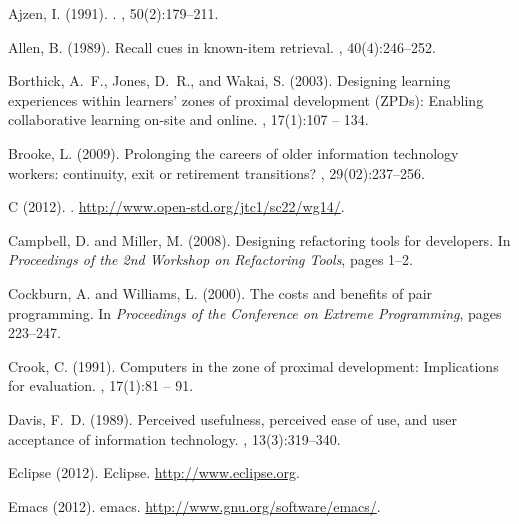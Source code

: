 \documentclass[smallextended]{svjour3}
\begin{document}

\begin{thebibliography}{}

Ajzen, I. (1991).
.
,
  50(2):179--211.

Allen, B. (1989).
\newblock Recall cues in known-item retrieval.
,
  40(4):246--252.

Borthick, A.~F., Jones, D.~R., and Wakai, S. (2003).
\newblock Designing learning experiences within learners' zones of proximal
  development ({ZPDs}): Enabling collaborative learning on-site and online.
, 17(1):107 -- 134.

Brooke, L. (2009).
\newblock Prolonging the careers of older information technology workers:
  continuity, exit or retirement transitions?
, 29(02):237--256.

C (2012).
.
\newblock \url{http://www.open-std.org/jtc1/sc22/wg14/}.

Campbell, D. and Miller, M. (2008).
\newblock Designing refactoring tools for developers.
\newblock In {\em Proceedings of the 2nd Workshop on Refactoring Tools}, pages
  1--2.

Cockburn, A. and Williams, L. (2000).
\newblock The costs and benefits of pair programming.
\newblock In {\em Proceedings of the Conference on Extreme Programming}, pages
  223--247.

Crook, C. (1991).
\newblock Computers in the zone of proximal development: Implications for
  evaluation.
, 17(1):81 -- 91.

Davis, F.~D. (1989).
\newblock Perceived usefulness, perceived ease of use, and user acceptance of
  information technology.
, 13(3):319--340.

Eclipse (2012).
\newblock Eclipse.
\newblock \url{http://www.eclipse.org}.

Emacs (2012).
\newblock emacs.
\newblock \url{http://www.gnu.org/software/emacs/}.


\end{thebibliography}
\end{document}
